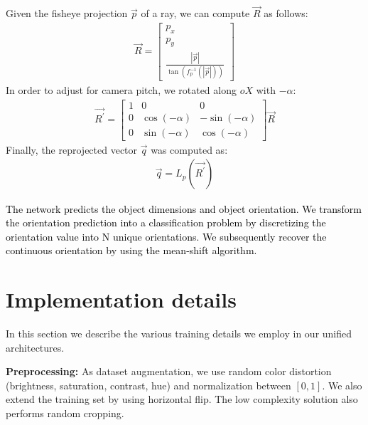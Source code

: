\documentclass[10pt,twocolumn,letterpaper]{article}
\begin{document}
Given the fisheye projection $ \vec{p} $ of a ray, we can compute $ \vec{R} $ as follows: 
\begin{equation}
\begin{aligned}
\vec{R} = \left[ \begin{array}{c} p_{x} \\ p_{y} \\ \frac{|\vec{p}|}{\tan(f_{p}^{-1}(|\vec{p}|))} \end{array} \right]
\end{aligned}
\end{equation}
In order to adjust for camera pitch, we rotated along $ oX $ with $ -\alpha $:
\begin{equation}
\begin{aligned}
\vec{R^{'}} = \left[ \begin{array}{ccc} 1 & 0 & 0 \\ 0 & \cos(-\alpha) & -\sin(-\alpha) \\ 0 & \sin(-\alpha) & \cos(-\alpha) \end{array} \right] \vec{R}
\end{aligned}
\end{equation}
Finally, the reprojected vector $ \vec{q} $ was computed as:
\begin{equation}
\begin{aligned}
\vec{q} = L_{p}(\vec{R^{'}})
 \end{aligned}
\end{equation}

\textcolor{black}{
The network predicts the object dimensions and object orientation. We transform the orientation prediction into a classification problem by discretizing the orientation value into N unique orientations. We subsequently recover the continuous orientation by using the mean-shift algorithm.}

\section{Implementation details}

In this section we describe the various training details we employ in our unified architectures.


\textbf{Preprocessing: } As dataset augmentation, we use random color distortion (brightness, saturation, contrast, hue) and normalization between $[0, 1]$. We also extend the training set by using horizontal flip. The low complexity solution also performs random cropping.
\end{document}
